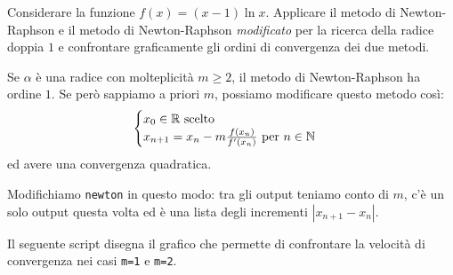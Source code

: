\begin{esercizio}
Considerare la funzione \(f(x) = (x-1)\ln x\). Applicare il metodo di \textenglish{Newton-Raphson} e il metodo di \textenglish{Newton-Raphson} {\em modificato} per la ricerca della radice doppia \(1\) e confrontare graficamente gli ordini di convergenza dei due metodi.
\end{esercizio}

Se \(\alpha\) è una radice con molteplicità \(m \ge 2\), il metodo di \textenglish{Newton-Raphson} ha ordine \(1\). Se però sappiamo a priori \(m\), possiamo modificare questo metodo così:
\[\begin{cases} x_0 \in \mathbb R \text{ scelto} \\ x_{n+1} = x_n - m\frac{f(x_n)}{f^\prime (x_n)} \text{ per } n \in \mathbb N \end{cases}\]
ed avere una convergenza quadratica.

Modifichiamo \lstinline£newton£ in questo modo: tra gli output teniamo conto di \(m\), c'è un solo output questa volta ed è una lista degli incrementi \(\left\lvert x_{n+1} - x_n \right\rvert\).



Il seguente script disegna il grafico che permette di confrontare la velocità di convergenza nei casi \lstinline£m=1£ e \lstinline£m=2£.




